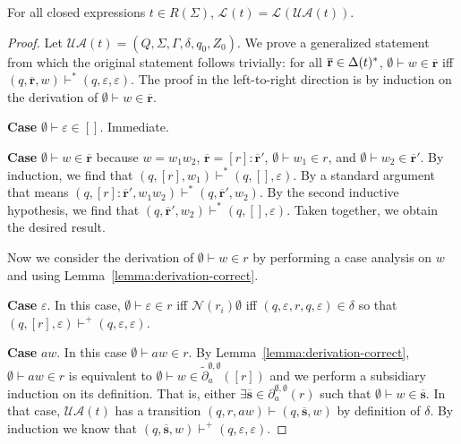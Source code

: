 \documentclass[runningheads, envcountsame, a4paper]{llncs}
\newcommand\IPD{\ensuremath\Delta}
\newcommand\pderiv[3][{}]{\partial^{#1}_{#3}(#2)}
\newcommand\cderiv[3][{}]{\tilde\partial^{#1}_{#3}(#2)}
\newcommand\Lang[1][{}]{\mathcal{L}^{#1}}
\renewcommand\L\Lang
\newcommand\PUSH{:}
\newcommand\SINGLETON[1]{{[#1]}}
\newcommand\Null{\mathcal{N}}
\newcommand\UA{\ensuremath{\mathcal{U}\mathcal{A}}}
\newcommand\RS{\ensuremath{\overline{\mathbf{r}}}}
\renewcommand\SS{\ensuremath{\overline{\mathbf{s}}}}
\newcommand\StepsTo\vdash
\begin{document}
\begin{theorem}\label{lemma:automaton-correctness}
  For all closed expressions $t\in R (\Sigma)$, $ \L (t) = \L(\UA (t))$.
\end{theorem}
\begin{proof}%
  Let $\UA (t) = (Q, \Sigma, \Gamma, \delta, q_0, Z_0)$.
  We prove a generalized statement from which the original statement
  follows trivially: for all $\RS \in \IPD (t)^*$, $\emptyset \vdash w \in
  \RS$ iff $(q, \RS, w) \StepsTo^* (q, \varepsilon, \varepsilon)$.
  The proof in the left-to-right direction is by induction on the derivation of $\emptyset \vdash w
  \in \RS$.

  \textbf{Case }$\emptyset \vdash \varepsilon \in
  \SINGLETON{}$. Immediate.

  \textbf{Case }$\emptyset \vdash w \in  \RS$ because
  $w=w_1w_2$, $\RS = \SINGLETON r\PUSH\RS'$, $\emptyset \vdash w_1 \in
  r$, and $\emptyset \vdash w_2 \in \RS'$.
  By induction, we find that $(q, \SINGLETON r, w_1) \vdash^* (q,
  \SINGLETON{}, \varepsilon)$. By a standard argument that means  $(q, \SINGLETON r\PUSH\RS', w_1w_2) \vdash^* (q,
  \RS', w_2)$. By the second inductive hypothesis, we find that $ (q,
  \RS', w_2) \vdash^* (q, \SINGLETON{}, \varepsilon)$. Taken together,
  we obtain the desired result.

  Now we consider the derivation of $\emptyset \vdash w \in r$ by
  performing a case analysis on $w$ and using Lemma~\ref{lemma:derivation-correct}.

  \textbf{Case }$\varepsilon$. In this case,
  $\emptyset \vdash \varepsilon \in r$ iff $\Null
  (r_i)\emptyset$ iff $(q, \varepsilon, r, q, \varepsilon)
  \in \delta$ so that  $(q, \SINGLETON{r}, \varepsilon) \StepsTo^+ (q, \varepsilon,
  \varepsilon)$.

  \textbf{Case }$aw$.
  In this case $\emptyset \vdash aw \in r$.
  By Lemma~\ref{lemma:derivation-correct}, $\emptyset \vdash aw \in
  r$ is equivalent to $\emptyset \vdash w \in
  \cderiv[\emptyset,\emptyset]{\SINGLETON{r}} a$ and we perform a
  subsidiary induction on its definition.
  That is, either 
  $\exists\SS\in\pderiv[\emptyset,\emptyset]{r} a$ such that
  $\emptyset \vdash w \in \SS$. In that case, $\UA (t)$ has a
  transition  $(q, r, aw) \StepsTo (q, \SS,
  w)$ by definition of $\delta$. By induction we know that $(q, \SS,
  w) \StepsTo^+ (q, \varepsilon, \varepsilon)$. 


\end{proof}
\end{document}

